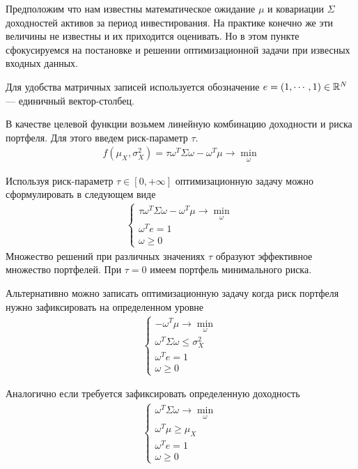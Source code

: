 Предположим что нам известны математическое ожидание $\mu$ и ковариации $\Sigma$ доходностей активов за период инвестирования.
На практике конечно же эти величины не известны и их приходится оценивать. Но в этом пункте сфокусируемся
на постановке и решении оптимизационной задачи при извесных входных данных.

Для удобства матричных записей используется обозначение $e = (1, \cdots, 1) \in \mathbb{R}^N$ --- единичный вектор-столбец.


В качестве целевой функции возьмем линейную комбинацию доходности и риска портфеля. Для этого введем риск-параметр $\tau$.
\begin{align}
	f\left(\mu_X, \sigma_X^2 \right) = \tau \omega^T \Sigma \omega - \omega^T \mu \rightarrow \min_{\omega}
\end{align}

Используя риск-параметр $\tau \in [0, +\infty]$ оптимизационную задачу можно сформулировать в следующем виде
\begin{align}
	\begin{cases}
		\tau \omega^T \Sigma \omega - \omega^T \mu \rightarrow \min_{\omega} \\
		\omega^T e = 1 \\
		\omega \ge 0
	\end{cases}
\end{align}
Множество решений при различных значениях $\tau$ образуют эффективное множество портфелей.
При $\tau = 0$ имеем портфель минимального риска.

Альтернативно можно записать оптимизационную задачу когда риск портфеля нужно зафиксировать на определенном уровне
\begin{align}
	\begin{cases}
		-\omega^T \mu \rightarrow \min_{\omega} \\
		\omega^T \Sigma \omega \le \sigma_X^2 \\
		\omega^T e = 1 \\
		\omega \ge 0
	\end{cases}
\end{align}

Аналогично если требуется зафиксировать определенную доходность
\begin{align}
	\begin{cases}
		\omega^T \Sigma \omega \rightarrow \min_{\omega} \\
		\omega^T \mu \ge \mu_X \\
		\omega^T e = 1 \\
		\omega \ge 0
	\end{cases}
\end{align}

